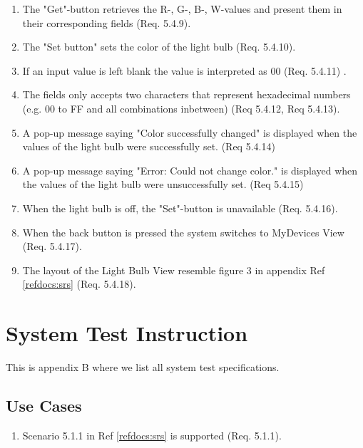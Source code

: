 \documentclass[a4paper]{article}
\newlength{\testlabellength}
\newenvironment{testlist}{\begin{enumerate}[label=\bfseries Instruction \thesubsection.\arabic* , labelindent=0pt, labelwidth=\testlabellength , leftmargin=2cm]}{\end{enumerate}}
\begin{document}
\begin{appendices}
\begin{testlist}
	\item The "Get"-button retrieves the R-, G-, B-, W-values and present them in their corresponding fields (Req. 5.4.9). 

	\item The "Set button" sets the color of the light bulb (Req. 5.4.10).

	\item If an input value is left blank the value is interpreted as 00 (Req. 5.4.11) .   
    
    \item The fields only accepts two characters that represent hexadecimal numbers (e.g. 00 to FF and all combinations inbetween) (Req 5.4.12, Req 5.4.13).
    
    \item A pop-up message saying "Color successfully changed" is displayed when the values of the light bulb were successfully set. (Req 5.4.14)
    
    \item A pop-up message saying "Error: Could not change color." is displayed when the values of the light bulb were unsuccessfully set. (Req 5.4.15)
       
    \item When the light bulb is off, the "Set"-button is unavailable (Req. 5.4.16).
    
    \item When the back button is pressed the system switches to MyDevices View (Req. 5.4.17).
    
    \item The layout of the Light Bulb View resemble figure 3 in appendix  Ref \ref{refdocs:srs} (Req. 5.4.18).

\end{testlist}	

\newpage

\section{System Test Instruction} \label{appendix:section:systemtest}
This is appendix B where we list all system test specifications.

\subsection{Use Cases}
\begin{testlist}
	\item Scenario 5.1.1 in Ref \ref{refdocs:srs} is supported (Req. 5.1.1).


\end{testlist}
\end{appendices}
\end{document}
